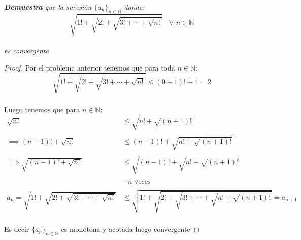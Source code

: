 \documentclass[11pt]{article}
\newcommand{\N}{\mathbb{N}}
\begin{document}
\begin{tcolorbox}[title = \textcolor{black}{\textcolor{white}{Problema 21}}]
\textit{\textbf{Demuestra} que la sucesi\'on $\{a_n\}_{n\in \N}$ donde:\,\\
\begin{equation*}
\sqrt{1!+\sqrt{2!+\sqrt{3!+\cdots+\sqrt{n!}}}}\,\,\,\,\,\forall\,\,n\in \N
\end{equation*}\,\\
es convergente}
\end{tcolorbox}
\begin{proof}
    Por el problema anterior tenemos que para toda $n\in \N$:\,\\
    \begin{equation*}
        \sqrt{1!+\sqrt{2!+\sqrt{3!+\cdots+\sqrt{n!}}}}\leq (0+1)!+1=2
    \end{equation*}\,\\
    Luego tenemos que para $n\in\N$:\,\\
    \begin{align*}
        \sqrt{n!}&\leq \sqrt{n!+\sqrt{(n+1)!}}\,\\
        \,\\
        \implies (n-1)!+\sqrt{n!}&\leq (n-1)!+\sqrt{n!+\sqrt{(n+1)!}}\,\\
        \,\\
        \implies \sqrt{(n-1)!+\sqrt{n!}}&\leq \sqrt{(n-1)!+\sqrt{n!+\sqrt{(n+1)!}}}\,\\
        \,\\
        &\cdots\text{$n$ veces}\,\\
        \,\\
        a_n=\sqrt{1!+\sqrt{2!+\sqrt{3!+\cdots+\sqrt{n!}}}}&\leq \sqrt{1!+\sqrt{2!+\sqrt{3!+\cdots+\sqrt{n!+\sqrt{(n+1)!}}}}}=a_{n+1}
    \end{align*}\,\\
    Es decir $\{a_n\}_{n\in \N}$ es mon\'otona y acotada luego convergente
\end{proof}
\end{document}
